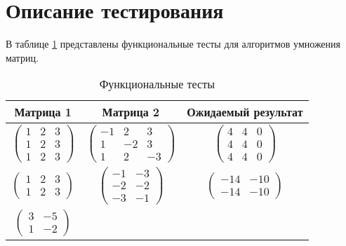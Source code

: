 \clearpage
\section{Описание тестирования}

В таблице \ref{tab:test} представлены функциональные тесты для алгоритмов умножения матриц.
\begin{table}[h!]
	\begin{center}
        \caption{\label{tab:test}Функциональные тесты}
        \begin{tabular}{|c|c|c|}
			\hline
            \textbf{Матрица 1} & \textbf{Матрица 2} &\textbf{Ожидаемый
            результат} \\ [2mm]
            \hline
			$\begin{pmatrix}
                1 & 2 & 3\\
                1 & 2 & 3\\
                1 & 2 & 3
			\end{pmatrix}$ &
			$\begin{pmatrix}
                -1 & 2 & 3\\
                1 & -2 & 3\\
                1 & 2 & -3
			\end{pmatrix}$ &
			$\begin{pmatrix}
                4 & 4 & 0\\
                4 & 4 & 0\\
                4 & 4 & 0
			\end{pmatrix}$ \\
            \hline
			$\begin{pmatrix}
                1 & 2 & 3\\
                1 & 2 & 3
			\end{pmatrix}$ &
			$\begin{pmatrix}
                -1 & -3\\
                -2 & -2\\
                -3 & -1
			\end{pmatrix}$ &
			$\begin{pmatrix}
                -14 & -10\\
                -14 & -10
			\end{pmatrix}$ \\
            \hline
			$\begin{pmatrix}
                3 & -5\\
                1 & -2
			\end{pmatrix}$ &

\end{tabular}
\end{center}
\end{table}

